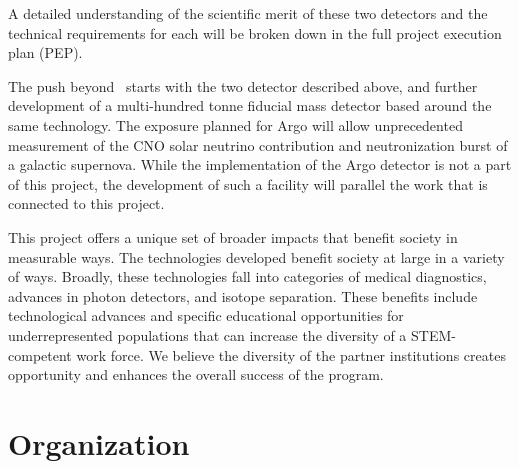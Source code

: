 A detailed understanding of the scientific merit of these two detectors and the technical requirements for each will be broken down in the full project execution plan (PEP).  

The push beyond \DSk\ starts with the two detector described above, and further development of a multi-hundred tonne fiducial mass detector based around the same technology.  The exposure planned for Argo will allow unprecedented measurement of the CNO solar neutrino contribution and neutronization burst of a galactic supernova.  While the implementation of the Argo detector is not a part of this project, the development of such a facility will parallel the work that is connected to this project.  

This project offers a unique set of broader impacts that benefit society in measurable ways.  The technologies developed benefit society at large in a variety of ways. Broadly, these technologies fall into categories of medical diagnostics, advances in photon detectors, and isotope separation.  These benefits include technological advances and specific educational opportunities for underrepresented populations that can increase the diversity of a STEM-competent work force.  We believe the diversity of the partner institutions creates opportunity and enhances the overall success of the program.






\section{Organization}


